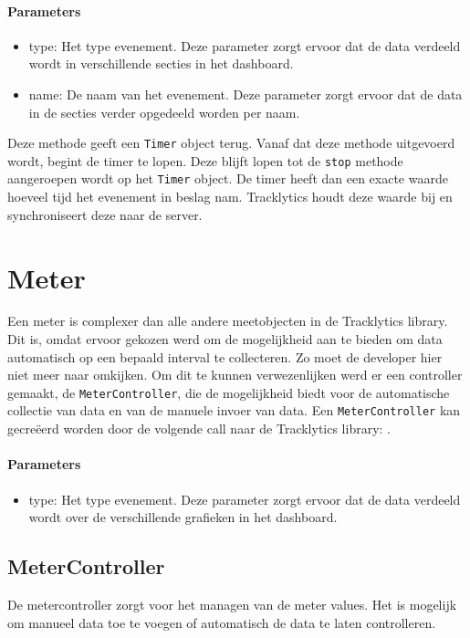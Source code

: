 \paragraph{Parameters}
\begin{itemize}
\item type: Het type evenement. Deze parameter zorgt ervoor dat de data verdeeld wordt in verschillende secties in het dashboard.
\item name: De naam van het evenement. Deze parameter zorgt ervoor dat de data in de secties verder opgedeeld worden per naam.
\end{itemize} 

Deze methode geeft een \texttt{Timer} object terug. Vanaf dat deze methode uitgevoerd wordt, begint de timer te lopen. Deze blijft lopen tot de \texttt{\justify stop} methode aangeroepen wordt op het \texttt{Timer} object. De timer heeft dan een exacte waarde hoeveel tijd het evenement in beslag nam. Tracklytics houdt deze waarde bij en synchroniseert deze naar de server. 


\section{Meter}
Een meter is complexer dan alle andere meetobjecten in de Tracklytics library. Dit is, omdat ervoor gekozen werd om de mogelijkheid aan te bieden om data automatisch op een bepaald interval te collecteren. Zo moet de developer hier niet meer naar omkijken. Om dit te kunnen verwezenlijken werd er een controller gemaakt, de \texttt{MeterController}, die de mogelijkheid biedt voor de automatische collectie van data en van de manuele invoer van data. Een \texttt{MeterController} kan gecre\"eerd worden door de volgende call naar de Tracklytics library: \texttt{}. 

\paragraph{Parameters}
\begin{itemize}
\item type: Het type evenement. Deze parameter zorgt ervoor dat de data verdeeld wordt over de verschillende grafieken in het dashboard.
\end{itemize}

\subsection{MeterController}
De metercontroller zorgt voor het managen van de meter values. Het is mogelijk om manueel data toe te voegen of automatisch de data te laten controlleren. \\

